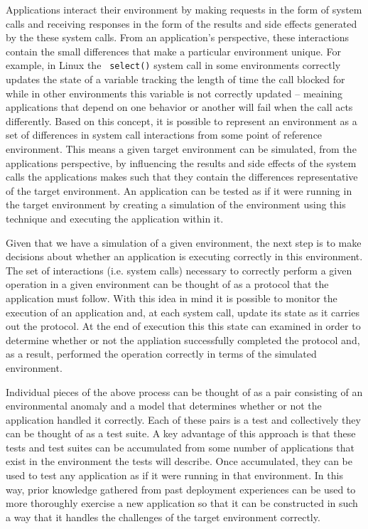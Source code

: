 Applications interact their environment by making requests in the form of system calls and receiving responses in the
form of the results and side effects generated by the these system calls.  From an application's perspective, these
interactions contain the small differences that make a particular environment unique.  For example, in Linux the {\tt
  select()} system call in some environments correctly updates the state of a variable tracking the length of time the
call blocked for while in other environments this variable is not correctly updated -- meaining applications that depend
on one behavior or another will fail when the call acts differently.  Based on this concept, it is possible to represent
an environment as a set of differences in system call interactions from some point of reference environment.  This means
a given target environment can be simulated, from the applications perspective, by influencing the results and side
effects of the system calls the applications makes such that they contain the differences representative of the target
environment.  An application can be tested as if it were running in the target environment by creating a simulation of
the environment using this technique and executing the application within it.

Given that we have a simulation of a given environment, the next step is to make decisions about whether an application
is executing correctly in this environment.  The set of interactions (i.e. system calls) necessary to correctly perform
a given operation in a given environment can be thought of as a protocol that the application must follow.  With this
idea in mind it is possible to monitor the execution of an application and, at each system call, update its state as it
carries out the protocol.  At the end of execution this this state can examined in order to determine whether or not the
appliation successfully completed the protocol and, as a result, performed the operation correctly in terms of the
simulated environment.

Individual pieces of the above process can be thought of as a pair consisting of an environmental anomaly and a model
that determines whether or not the application handled it correctly.  Each of these pairs is a test and collectively
they can be thought of as a test suite.  A key advantage of this approach is that these tests and test suites can be
accumulated from some number of applications that exist in the environment the tests will describe.  Once accumulated,
they can be used to test any application as if it were running in that environment.  In this way, prior knowledge
gathered from past deployment experiences can be used to more thoroughly exercise a new application so that it can be
constructed in such a way that it handles the challenges of the target environment correctly.

